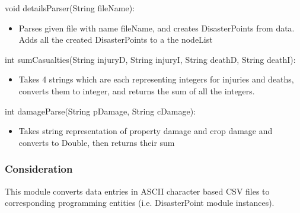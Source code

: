 \documentclass[12pt]{article}
\begin{document}
                \noindent void detailsParser(String fileName):
                \begin{itemize}
                    \item Parses given file with name fileName, and creates DisasterPoints from data.
                    Adds all the created DisasterPoints to a the nodeList
                \end{itemize}
                
                \noindent int sumCasualties(String injuryD, String injuryI, String deathD, String deathI):
                \begin{itemize}
                    \item Takes 4 strings which are each representing integers for injuries and deaths,
                    converts them to integer, and returns the sum of all the integers.
                \end{itemize}
                
                \noindent int damageParse(String pDamage, String cDamage):
                \begin{itemize}
                    \item Takes string representation of  property damage and crop damage and
                    converts to Double, then returns their sum
                \end{itemize}
                
                \subsubsection*{Consideration}
                
                This module converts data entries in ASCII character based CSV files to corresponding
                programming entities (i.e. DisasterPoint module instances).
                
                
                
                \newpage
\end{document}
